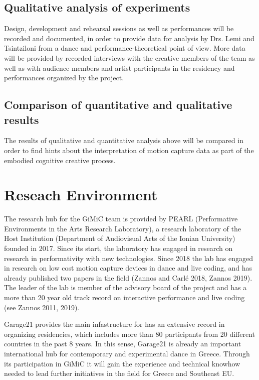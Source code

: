 \subsection{Qualitative analysis of experiments}
\label{sec:org1fae270}
Design, development and rehearsal sessions as well as performances will be recorded and documented, in order to provide data for analysis by Drs. Lemi and Tsintziloni from a dance and performance-theoretical point of view.  More data will be provided by recorded interviews with the creative members of the team as well as with audience members and artist participants in the residency and performances organized by the project. 

\subsection{Comparison of quantitative and qualitative results}
\label{sec:org575abd0}
The results of qualitative and quantitative analysis above will be compared in order to find hints about the interpretation of motion capture data as part of the embodied cognitive creative process.

\section{Reseach Environment}
\label{sec:org4afa8c8}
The research hub for the GiMiC team is provided by PEARL (Performative Environments in the Arts Research Laboratory), a research laboratory of the Host Institution (Department of Audiovisual Arts of the Ionian University) founded in 2017.  Since its start, the laboratory has engaged in research on research in performativity with new technologies.  Since 2018 the lab has engaged in research on low cost motion capture devices in dance and live coding, and has already published two papers in the field (Zannos and Carlé 2018, Zannos 2019). The leader of the lab is member of the advisory board of the project and has a more than 20 year old track record on interactive performance and live coding (see Zannos 2011, 2019). 

Garage21 provides the main infastructure for  has an extensive record in organizing residencies, which includes more than 80 participants from 20 different countries in the past 8 years.  In this sense, Garage21 is already an important international hub for contemporary and experimental dance in Greece.  Through its participation in GiMiC it will gain the experience and technical knowhow needed to lead further initiatives in the field for Greece and Southeast EU. 

